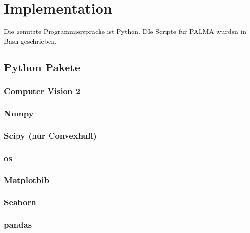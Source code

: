 \chapter{Implementation}
\label{ch:implementation}
Die genutzte Programmiersprache ist Python. DIe Scripte für PALMA wurden in Bash geschrieben.
\section{Python Pakete}
\subsection{Computer Vision 2}
\subsection{Numpy}
\subsection{Scipy (nur Convexhull)}
\subsection{os}
\subsection{Matplotbib}
\subsection{Seaborn}
\subsection{pandas}



